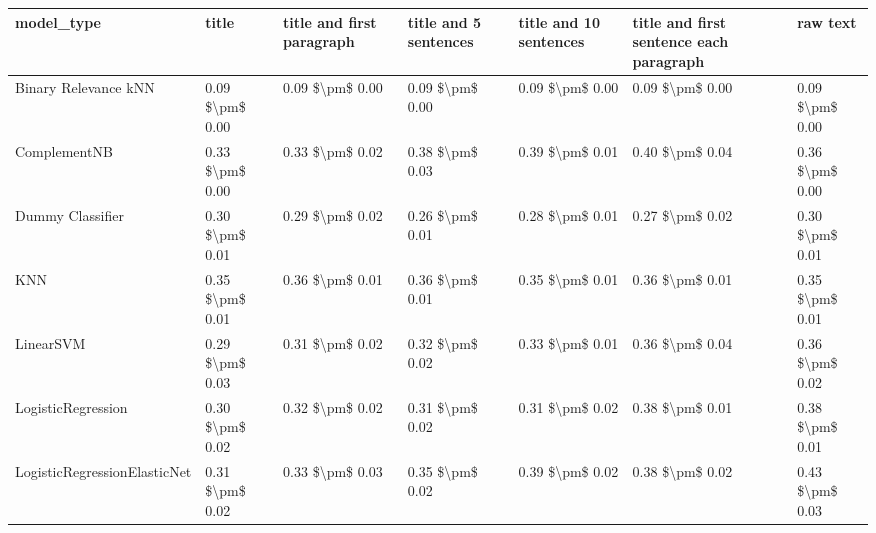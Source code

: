 \begin{tabular}{lllllll}
\toprule
                     model\_type &           title & title and first paragraph & title and 5 sentences & title and 10 sentences & title and first sentence each paragraph &            raw text \\
\midrule
           Binary Relevance kNN & 0.09 \$\textbackslash pm\$ 0.00 &           0.09 \$\textbackslash pm\$ 0.00 &       0.09 \$\textbackslash pm\$ 0.00 &        0.09 \$\textbackslash pm\$ 0.00 &                         0.09 \$\textbackslash pm\$ 0.00 &     0.09 \$\textbackslash pm\$ 0.00 \\
                   ComplementNB & 0.33 \$\textbackslash pm\$ 0.00 &           0.33 \$\textbackslash pm\$ 0.02 &       0.38 \$\textbackslash pm\$ 0.03 &        0.39 \$\textbackslash pm\$ 0.01 &                         0.40 \$\textbackslash pm\$ 0.04 &     0.36 \$\textbackslash pm\$ 0.00 \\
               Dummy Classifier & 0.30 \$\textbackslash pm\$ 0.01 &           0.29 \$\textbackslash pm\$ 0.02 &       0.26 \$\textbackslash pm\$ 0.01 &        0.28 \$\textbackslash pm\$ 0.01 &                         0.27 \$\textbackslash pm\$ 0.02 &     0.30 \$\textbackslash pm\$ 0.01 \\
                            KNN & 0.35 \$\textbackslash pm\$ 0.01 &           0.36 \$\textbackslash pm\$ 0.01 &       0.36 \$\textbackslash pm\$ 0.01 &        0.35 \$\textbackslash pm\$ 0.01 &                         0.36 \$\textbackslash pm\$ 0.01 &     0.35 \$\textbackslash pm\$ 0.01 \\
                      LinearSVM & 0.29 \$\textbackslash pm\$ 0.03 &           0.31 \$\textbackslash pm\$ 0.02 &       0.32 \$\textbackslash pm\$ 0.02 &        0.33 \$\textbackslash pm\$ 0.01 &                         0.36 \$\textbackslash pm\$ 0.04 &     0.36 \$\textbackslash pm\$ 0.02 \\
             LogisticRegression & 0.30 \$\textbackslash pm\$ 0.02 &           0.32 \$\textbackslash pm\$ 0.02 &       0.31 \$\textbackslash pm\$ 0.02 &        0.31 \$\textbackslash pm\$ 0.02 &                         0.38 \$\textbackslash pm\$ 0.01 &     0.38 \$\textbackslash pm\$ 0.01 \\
   LogisticRegressionElasticNet & 0.31 \$\textbackslash pm\$ 0.02 &           0.33 \$\textbackslash pm\$ 0.03 &       0.35 \$\textbackslash pm\$ 0.02 &        0.39 \$\textbackslash pm\$ 0.02 &                         0.38 \$\textbackslash pm\$ 0.02 &     0.43 \$\textbackslash pm\$ 0.03 \\

\end{tabular}
